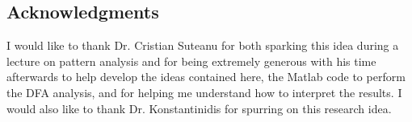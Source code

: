 \documentclass[12pt]{article}
\begin{document}
\subsection{Acknowledgments}
I would like to thank Dr. Cristian Suteanu for both sparking this idea during a lecture on pattern analysis and for being extremely generous with his time afterwards to help develop the ideas contained here, the Matlab code to perform the DFA analysis, and for helping me understand how to interpret the results.
I would also like to thank Dr. Konstantinidis for spurring on this research idea.
\newpage



\newpage
%

%

%


%

%

\end{document}
